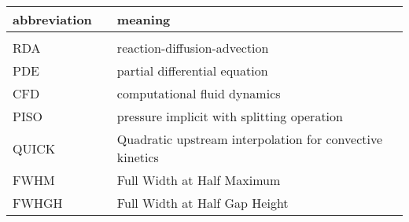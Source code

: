 \documentclass[../thesis.tex]{subfiles}
\begin{document}
\small
\begin{tabular}{p{4cm}p{3cm}p{8cm}}
	\textbf{abbreviation} & & \textbf{meaning} \\ 
	\hline \\[\dimexpr-\normalbaselineskip+2pt] 
	RDA & & reaction-diffusion-advection \\
	PDE & & partial differential equation \\
	CFD && computational fluid dynamics \\
	PISO & & pressure implicit with splitting operation \\
	QUICK & & Quadratic upstream interpolation for convective kinetics \\
	FWHM & & Full Width at Half Maximum \\
	FWHGH & & Full Width at Half Gap Height \\
\end{tabular}

\listoffigures
\listoftables
\end{document}
